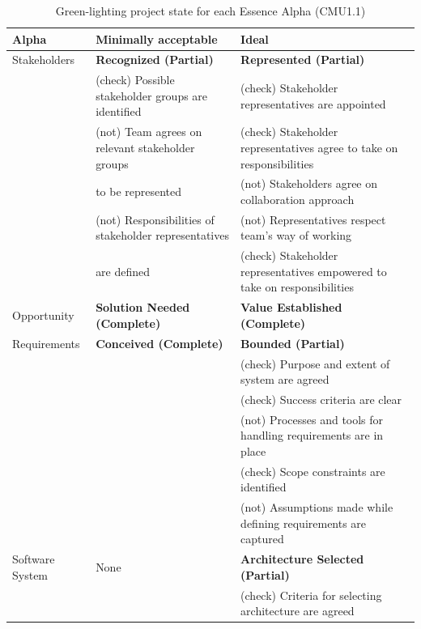 \documentclass[conference]{IEEEtran}
\begin{document}
\begin{table}
\caption{Green-lighting project state for each Essence Alpha (CMU1.1)}
\label{GreenLightingProjectState}
\begin{tabular}{|l|p{2.50in}|p{3.35in}|}
\hline
\textbf{Alpha}  & \textbf{Minimally acceptable}       & \textbf{Ideal}                        \\ \hline
Stakeholders    & \textbf{Recognized (Partial)}       & \textbf{Represented (Partial)}        \\ 
                & (check) Possible stakeholder groups are identified & (check) Stakeholder representatives are appointed \\
                & (not) Team agrees on relevant stakeholder groups & (check) Stakeholder representatives agree to take on responsibilities \\
                & to be represented                 & (not) Stakeholders agree on collaboration approach \\
                & (not) Responsibilities of stakeholder representatives  & (not) Representatives respect team's way of working \\
                & are defined                         & (check) Stakeholder representatives empowered to take on responsibilities \\ \hline
Opportunity     & \textbf{Solution Needed (Complete)} & \textbf{Value Established (Complete)} \\[5ex] \hline
Requirements    & \textbf{Conceived (Complete)}       & \textbf{Bounded (Partial)}            \\
                &                                     & (check) Purpose and extent of system are agreed \\
                &                                     & (check) Success criteria are clear \\
                &                                     & (not) Processes and tools for handling requirements are in place \\
                &                                     & (check) Scope constraints are identified \\
                &                                     & (not) Assumptions made while defining requirements are captured \\ \hline
Software System & None                                & \textbf{Architecture Selected (Partial)} \\
                &                                     & (check) Criteria for selecting architecture are agreed \\

\end{tabular}
\end{table}
\end{document}
